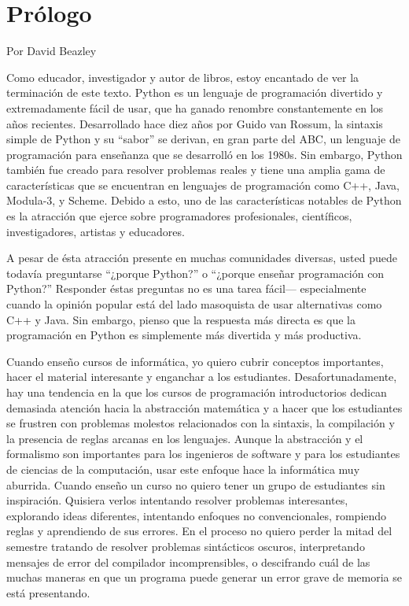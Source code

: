 
\chapter{Prólogo}

Por David Beazley

Como educador, investigador y autor de libros, estoy encantado de ver
la terminación de este texto.  Python es un lenguaje de programación divertido 
y extremadamente fácil de usar, que ha ganado renombre constantemente en los 
años recientes.  Desarrollado hace diez años por Guido van Rossum, la sintaxis 
simple de Python y su ``sabor'' se derivan, en gran parte del ABC, un lenguaje 
de programación para  enseñanza que se desarrolló en los 1980s.  Sin embargo, 
Python también fue creado para resolver problemas reales y tiene una amplia 
gama de características que se encuentran en lenguajes de programación como 
C++, Java, Modula-3, y Scheme.  Debido a esto, uno de las características 
notables de Python es  la  atracción que ejerce sobre programadores 
profesionales, científicos, investigadores, artistas y educadores.

A pesar de ésta atracción presente en  muchas  comunidades diversas, usted 
puede todavía preguntarse ``¿porque Python?'' o ``¿porque enseñar programación 
con Python?'' Responder éstas preguntas no es una tarea fácil---
especialmente cuando la opinión popular está del lado masoquista
de usar alternativas como C++ y Java.  Sin embargo, pienso que la respuesta más 
directa es que la programación en Python es simplemente más divertida y más 
productiva.

Cuando enseño cursos de informática, yo quiero cubrir conceptos
importantes, hacer el material interesante y enganchar a los estudiantes.
Desafortunadamente, hay una tendencia en la  que los cursos de programación
introductorios dedican demasiada atención hacia la abstracción
matemática y a hacer que los estudiantes se frustren con problemas
molestos relacionados con la sintaxis, la compilación  y la presencia
de reglas arcanas en los lenguajes. Aunque la abstracción y el formalismo
son importantes para los ingenieros de software y para los estudiantes de
ciencias de la computación, usar este enfoque hace la informática muy aburrida.
Cuando enseño un curso no quiero tener un grupo de estudiantes sin inspiración.
Quisiera verlos intentando resolver problemas interesantes, explorando ideas 
diferentes, intentando enfoques no convencionales, rompiendo reglas y 
aprendiendo de sus errores. 
En el proceso no quiero perder la mitad del semestre tratando de resolver
problemas sintácticos oscuros, interpretando mensajes de error del compilador 
incomprensibles, o descifrando cuál de las muchas maneras en que un programa 
puede generar un error grave de memoria se está presentando.

